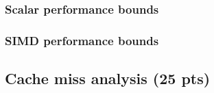 \subsubsection{Scalar performance bounds}

\subsubsection{SIMD performance bounds}


\subsection{Cache miss analysis (25 pts)}

